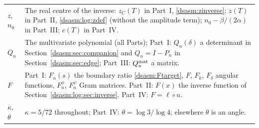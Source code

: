 \documentclass[11pt,letterpaper]{article}
\theoremstyle{remark}\newtheorem{remark}[theorem]{Remark}
\begin{document}
\begin{longtable}{@{}>{\raggedright\arraybackslash}p{} >{\raggedright\arraybackslash}p{}@{}}
$z$, $n_0$ & The real centre of the inverse: $z_C(T)$ in Part~I, \eqref{dsasm:zinverse}; $z(T)$ in Part~II, \eqref{dsasm:log:zdef} (without the amplitude term); $n_0-\beta/(2\alpha)$ in Part~III; $c(T)$ in Part~IV.\\
$Q_n$ & The multivariate polynomial (all Parts); Part~I: $Q_n(\delta)$ a determinant in Section~\ref{dsasm:sec:companion} and $Q_n=I-P_n$ in Section~\ref{dsasm:sec:edge}; Part~III: $Q_n^{\rm mat}$ a matrix.\\
$F$ & Part~I: $F_n(s)$ the boundary ratio \eqref{dsasm:Ftarget}, $F$, $F_k$, $F_\delta$ angular functions, $F_n^\phi$, $F_n^\psi$ Gram matrices. Part~II: $F(x)$ the inverse function of Section~\ref{dsasm:log:sec:inverse}. Part~IV: $F=\ell\circ u$.\\
$\kappa$, $\theta$ & $\kappa=5/72$ throughout; Part~IV: $\theta=\log3/\log4$; elsewhere $\theta$ is an angle.\\
\bottomrule
\end{longtable}
\addtocounter{table}{-1}%
\endgroup
\end{document}
